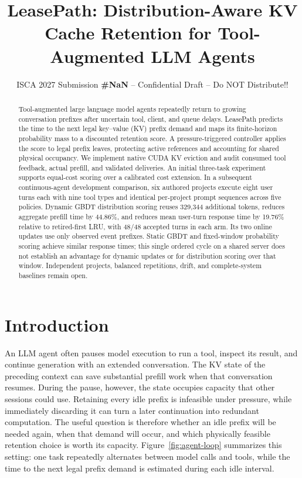 \documentclass[sigconf, screen, review]{acmart}
\newcommand{\iscasubmissionnumber}{NaN}
\begin{document}
\title{LeasePath: Distribution-Aware KV Cache Retention for Tool-Augmented LLM Agents}
\author{ISCA 2027 Submission \textbf{\#\iscasubmissionnumber} -- Confidential Draft -- Do NOT Distribute!!}
\renewcommand{\shortauthors}{ISCA 2027 Submission \#\iscasubmissionnumber}

\begin{abstract}
Tool-augmented large language model agents repeatedly return to growing
conversation prefixes after uncertain tool, client, and queue delays.
LeasePath predicts the time to the next legal key--value (KV) prefix
demand and maps its finite-horizon probability mass to a discounted
retention score. A pressure-triggered controller applies the score to
legal prefix leaves, protecting active references and accounting for
shared physical occupancy. We implement native CUDA KV eviction and
audit consumed tool feedback, actual prefill, and validated deliveries.
An initial three-task experiment supports equal-cost scoring over a
calibrated cost extension. In a subsequent continuous-agent development
comparison, six authored projects execute eight user turns each with
nine tool types and identical per-project prompt sequences across five
policies. Dynamic GBDT distribution scoring reuses 329,344 additional
tokens, reduces aggregate prefill time by 44.86\%, and reduces mean
user-turn response time by 19.76\% relative to retired-first LRU, with
48/48 accepted turns in each arm. Its two online updates use only
observed event prefixes. Static GBDT and fixed-window probability
scoring achieve similar response times; this single ordered cycle on a
shared server does not establish an advantage for dynamic updates or
for distribution scoring over that window. Independent projects,
balanced repetitions, drift, and complete-system baselines remain open.

\end{abstract}
\maketitle

\section{Introduction}\label{introduction}

An LLM agent often pauses model execution to run a tool, inspect its
result, and continue generation with an extended conversation. The KV
state of the preceding context can save substantial prefill work when
that conversation resumes. During the pause, however, the state occupies
capacity that other sessions could use. Retaining every idle prefix is
infeasible under pressure, while immediately discarding it can turn a
later continuation into redundant computation. The useful question is
therefore whether an idle prefix will be needed again, when that demand
will occur, and which physically feasible retention choice is worth its
capacity. Figure~\ref{fig:agent-loop} summarizes this setting: one task
repeatedly alternates between model calls and tools, while the time to the
next legal prefix demand is estimated during each idle interval.
\end{document}
